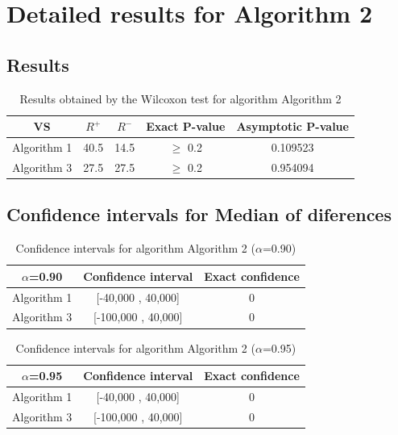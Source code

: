 \documentclass[a4paper,10pt]{article}
\begin{document}
 \clearpage 


\section{Detailed results for Algorithm 2}


\subsection{Results}

\begin{table}[!htp]
\centering\small
\begin{tabular}{
|c|c|c|c|c|}
\hline
 VS & $R^{+}$ & $R^{-}$ & Exact P-value & Asymptotic P-value \\ \hline 
Algorithm 1 & 40.5 & 14.5 & $\geq$ 0.2 & 0.109523\\ \hline 
Algorithm 3 & 27.5 & 27.5 & $\geq$ 0.2 & 0.954094\\ \hline 

\end{tabular}
\caption{Results obtained by the Wilcoxon test for algorithm Algorithm 2}
\end{table}

\subsection{Confidence intervals for Median of diferences}

\begin{table}[!htp]
\centering\small
\begin{tabular}{
|c|c|c|}
\hline
 $\alpha$=0.90 & Confidence interval & Exact confidence \\ \hline 
Algorithm 1 & [-40,000 , 40,000] & 0\\ \hline 
Algorithm 3 & [-100,000 , 40,000] & 0\\ \hline 

\end{tabular}
\caption{Confidence intervals for algorithm Algorithm 2 ($\alpha$=0.90)}
\end{table}
\begin{table}[!htp]
\centering\small
\begin{tabular}{
|c|c|c|}
\hline
 $\alpha$=0.95 & Confidence interval & Exact confidence \\ \hline 
Algorithm 1 & [-40,000 , 40,000] & 0\\ \hline 
Algorithm 3 & [-100,000 , 40,000] & 0\\ \hline 

\end{tabular}
\caption{Confidence intervals for algorithm Algorithm 2 ($\alpha$=0.95)}
\end{table}
\end{document}
